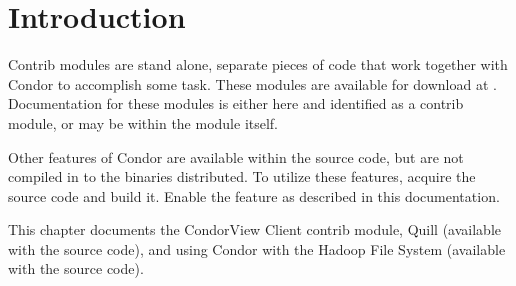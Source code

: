 \section{\label{sec:Contrib-Info}Introduction}

Contrib modules are stand alone, separate pieces of code that work
together with Condor to accomplish some task.
These modules are available for download at 
.
Documentation for these modules is either here and identified
as a contrib module, 
or may be within the module itself.

Other features of Condor are available within the source code,
but are not compiled in to the binaries distributed.
To utilize these features, 
acquire the source code and build it.
Enable the feature as described in this documentation.

This chapter documents the CondorView Client contrib module,
Quill (available with the source code),
and using Condor with the Hadoop File System (available with the source code).






